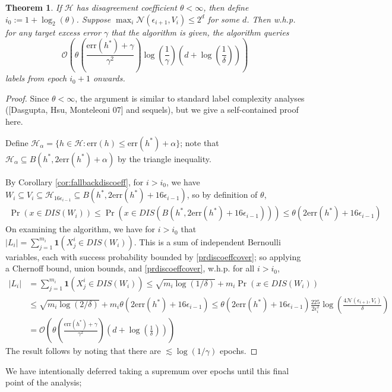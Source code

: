 \documentclass{article}[12pt]
\newtheorem{thm}{Theorem}%
\theoremstyle{named}
\DeclareMathOperator{\Prtxt}{Pr}
\newcommand{\ifn}{\mathbf{1}} %
\newcommand{\abs}[1]{\left| #1 \right|}
\newcommand{\prp}[2]{\Prtxt_{#2} \left(#1\right)}
\newcommand{\err}[1]{\mbox{err}\left(#1\right)}
\newcommand{\cH}{\mathcal{H}}
\newcommand{\cN}{\mathcal{N}}
\newcommand{\cO}[1]{\mathcal{O}\left(#1\right)}
\newcommand{\lrp}[1]{\left(#1\right)}
\begin{document}
\begin{thm}
If $\cH$ has disagreement coefficient $\theta < \infty$, then define $i_0 := 1 + \log_2 (\theta)$. 
Suppose $\max_i \cN(\epsilon_{i+1}, V_i) \leq 2^d$ for some $d$.
Then w.h.p. for any target excess error $\gamma$ that the algorithm is given, 
the algorithm queries 
$$ \cO{ \theta \lrp{\frac{\err{h^*} + \gamma}{\gamma^2}} \log \lrp{\frac{1}{\gamma}} \lrp{d + \log \lrp{\frac{1}{\delta}} } } $$
labels from epoch $i_0+1$ onwards.
\end{thm}
\begin{proof}
Since $\theta < \infty$, the argument is similar 
to standard label complexity analyses ([Dasgupta, Hsu, Monteleoni 07] and sequels), 
but we give a self-contained proof here. 

Define $\cH_{\alpha} = \{ h \in \cH : \err{h} \leq \err{h^*} + \alpha \}$; 
note that $\cH_{\alpha} \subseteq B(h^*, 2 \err{h^*} + \alpha)$ by the triangle inequality. 

By Corollary \ref{cor:fallbackdiscoeff}, for $i > i_0$, 
we have $W_i \subseteq V_i \subseteq \cH_{16 \epsilon_{i-1}} \subseteq B(h^*, 2 \err{h^*} + 16 \epsilon_{i-1})$, 
so by definition of $\theta$,
\begin{align}
\label{prdiscoeffcover}
\prp{x \in DIS(W_i)}{} \leq \prp{x \in DIS(B(h^*, 2 \err{h^*} + 16 \epsilon_{i-1})) }{} \leq \theta (2 \err{h^*} + 16 \epsilon_{i-1})
\end{align}
On examining the algorithm, we have for $i > i_0$ that 
$ \abs{L_i} = \sum_{j=1}^{m_i} \ifn(X^i_j \in DIS(W_i))$. 
This is a sum of independent Bernoulli variables, 
each with success probability bounded by \eqref{prdiscoeffcover}; 
so applying a Chernoff bound, union bounds, and \eqref{prdiscoeffcover}, 
w.h.p. for all $i > i_0$,
\begin{align*}
\abs{L_i} &= \sum_{j=1}^{m_i} \ifn(X^i_j \in DIS(W_i)) \leq \sqrt{m_i \log(1/\delta)} + m_i \prp{x \in DIS(W_i)}{} \\
&\leq \sqrt{m_i \log(2/\delta)} + m_i \theta (2 \err{h^*} + 16 \epsilon_{i-1}) 
\leq \theta (2 \err{h^*} + 16 \epsilon_{i-1}) \frac{225}{2 \epsilon_i^2} \log \lrp{\frac{4 \cN(\epsilon_{i+1}, V_i)}{\delta}} \\
&= \cO{ \theta \lrp{\frac{\err{h^*} + \gamma}{\gamma^2}} \lrp{d + \log \lrp{\frac{1}{\delta}} } }
\end{align*}
The result follows by noting that there are $\lesssim \log(1/\gamma)$ epochs.
\end{proof}
We have intentionally deferred taking a supremum over epochs until this final point of the analysis; 
\end{document}
